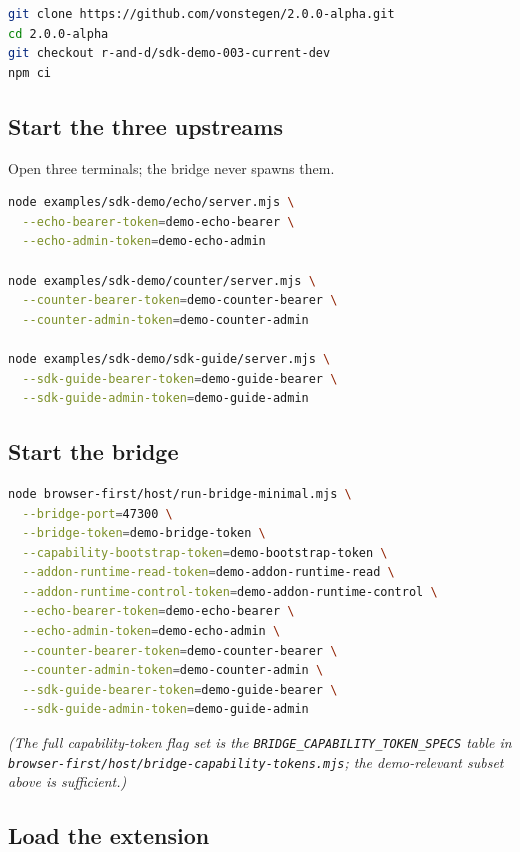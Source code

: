 \documentclass[11pt]{article}
\begin{document}
\begin{lstlisting}[language=bash]
git clone https://github.com/vonstegen/2.0.0-alpha.git
cd 2.0.0-alpha
git checkout r-and-d/sdk-demo-003-current-dev
npm ci
\end{lstlisting}

\subsection{Start the three upstreams}

Open three terminals; the bridge never spawns them.

\begin{lstlisting}[language=bash]
node examples/sdk-demo/echo/server.mjs \
  --echo-bearer-token=demo-echo-bearer \
  --echo-admin-token=demo-echo-admin

node examples/sdk-demo/counter/server.mjs \
  --counter-bearer-token=demo-counter-bearer \
  --counter-admin-token=demo-counter-admin

node examples/sdk-demo/sdk-guide/server.mjs \
  --sdk-guide-bearer-token=demo-guide-bearer \
  --sdk-guide-admin-token=demo-guide-admin
\end{lstlisting}

\subsection{Start the bridge}

\begin{lstlisting}[language=bash]
node browser-first/host/run-bridge-minimal.mjs \
  --bridge-port=47300 \
  --bridge-token=demo-bridge-token \
  --capability-bootstrap-token=demo-bootstrap-token \
  --addon-runtime-read-token=demo-addon-runtime-read \
  --addon-runtime-control-token=demo-addon-runtime-control \
  --echo-bearer-token=demo-echo-bearer \
  --echo-admin-token=demo-echo-admin \
  --counter-bearer-token=demo-counter-bearer \
  --counter-admin-token=demo-counter-admin \
  --sdk-guide-bearer-token=demo-guide-bearer \
  --sdk-guide-admin-token=demo-guide-admin
\end{lstlisting}

\emph{(The full capability-token flag set is the
\texttt{BRIDGE\_CAPABILITY\_TOKEN\_SPECS} table in
\texttt{browser-first/host/bridge-capability-tokens.mjs}; the demo-relevant
subset above is sufficient.)}

\subsection{Load the extension}
\end{document}
